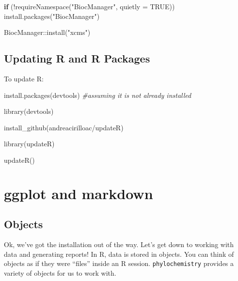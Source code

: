 \documentclass[
]{krantz}
\newenvironment{Shaded}{\begin{snugshade}}{\end{snugshade}}
\newcommand{\AttributeTok}[1]{\textcolor[rgb]{0.77,0.63,0.00}{#1}}
\newcommand{\CommentTok}[1]{\textcolor[rgb]{0.56,0.35,0.01}{\textit{#1}}}
\newcommand{\ConstantTok}[1]{\textcolor[rgb]{0.00,0.00,0.00}{#1}}
\newcommand{\ControlFlowTok}[1]{\textcolor[rgb]{0.13,0.29,0.53}{\textbf{#1}}}
\newcommand{\FunctionTok}[1]{\textcolor[rgb]{0.00,0.00,0.00}{#1}}
\newcommand{\NormalTok}[1]{#1}
\newcommand{\SpecialCharTok}[1]{\textcolor[rgb]{0.00,0.00,0.00}{#1}}
\newcommand{\StringTok}[1]{\textcolor[rgb]{0.31,0.60,0.02}{#1}}
\begin{document}
\begin{Shaded}
\begin{Highlighting}[]
\ControlFlowTok{if}\NormalTok{ (}\SpecialCharTok{!}\FunctionTok{requireNamespace}\NormalTok{(}\StringTok{"BiocManager"}\NormalTok{, }\AttributeTok{quietly =} \ConstantTok{TRUE}\NormalTok{))}
    \FunctionTok{install.packages}\NormalTok{(}\StringTok{"BiocManager"}\NormalTok{)}

\NormalTok{BiocManager}\SpecialCharTok{::}\FunctionTok{install}\NormalTok{(}\StringTok{"xcms"}\NormalTok{)}
\end{Highlighting}
\end{Shaded}

\hypertarget{updating-r-and-r-packages}{%
\subsection{Updating R and R Packages}\label{updating-r-and-r-packages}}

To update R:

\begin{Shaded}
\begin{Highlighting}[]

\FunctionTok{install.packages}\NormalTok{(}\StringTok{\textquotesingle{}devtools\textquotesingle{}}\NormalTok{) }\CommentTok{\#assuming it is not already installed}

\FunctionTok{library}\NormalTok{(devtools)}

\FunctionTok{install\_github}\NormalTok{(}\StringTok{\textquotesingle{}andreacirilloac/updateR\textquotesingle{}}\NormalTok{)}

\FunctionTok{library}\NormalTok{(updateR)}

\FunctionTok{updateR}\NormalTok{()}
\end{Highlighting}
\end{Shaded}

\hypertarget{R_Markdown}{%
\section{ggplot and markdown}\label{R_Markdown}}

\hypertarget{objects}{%
\subsection{Objects}\label{objects}}

Ok, we've got the installation out of the way. Let's get down to working with data and generating reports! In R, data is stored in objects. You can think of objects as if they were ``files'' inside an R session. \texttt{phylochemistry} provides a variety of objects for us to work with.
\end{document}
